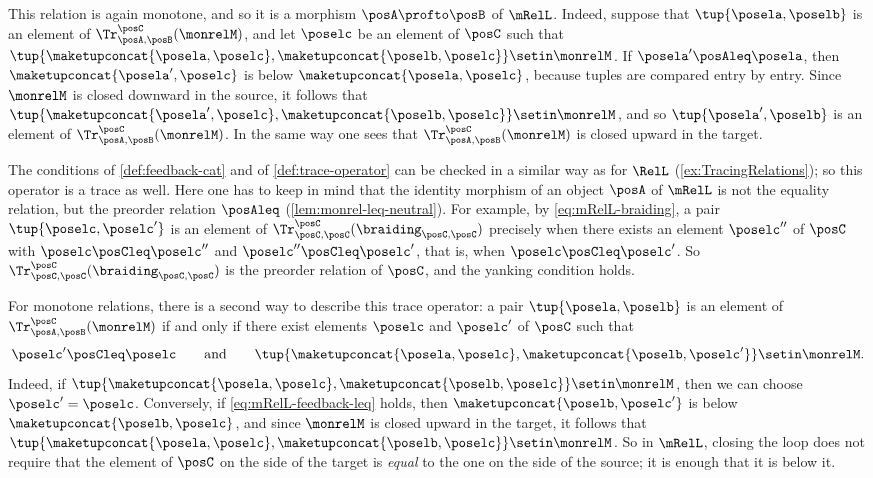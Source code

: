 This relation is again monotone, and so it is a morphism $\posA \profto \posB$ of $\mRelL$.
Indeed, suppose that $\tup{\posela, \poselb}$ is an element of $\Tr_{\posA,\posB}^{\posC}(\monrelM)$, and let $\poselc$ be an element of $\posC$ such that $\tup{\maketupconcat{\posela, \poselc}, \maketupconcat{\poselb, \poselc}} \setin \monrelM$.
If $\posela' \posAleq \posela$, then $\maketupconcat{\posela', \poselc}$ is below $\maketupconcat{\posela, \poselc}$, because tuples are compared entry by entry.
Since $\monrelM$ is closed downward in the source, it follows that $\tup{\maketupconcat{\posela', \poselc}, \maketupconcat{\poselb, \poselc}} \setin \monrelM$, and so $\tup{\posela', \poselb}$ is an element of $\Tr_{\posA,\posB}^{\posC}(\monrelM)$.
In the same way one sees that $\Tr_{\posA,\posB}^{\posC}(\monrelM)$ is closed upward in the target.

The conditions of \cref{def:feedback-cat} and of \cref{def:trace-operator} can be checked in a similar way as for $\RelL$ (\cref{ex:TracingRelations}); so this operator is a trace as well.
Here one has to keep in mind that the identity morphism of an object $\posA$ of $\mRelL$ is not the equality relation, but the preorder relation $\posAleq$ (\cref{lem:monrel-leq-neutral}).
For example, by \cref{eq:mRelL-braiding}, a pair $\tup{\poselc, \poselc'}$ is an element of $\Tr_{\posC,\posC}^{\posC}(\braiding_{\posC,\posC})$ precisely when there exists an element $\poselc''$ of $\posC$ with $\poselc \posCleq \poselc''$ and $\poselc'' \posCleq \poselc'$, that is, when $\poselc \posCleq \poselc'$.
So $\Tr_{\posC,\posC}^{\posC}(\braiding_{\posC,\posC})$ is the preorder relation of $\posC$, and the yanking condition holds.

For monotone relations, there is a second way to describe this trace operator: a pair $\tup{\posela, \poselb}$ is an element of $\Tr_{\posA,\posB}^{\posC}(\monrelM)$ if and only if there exist elements $\poselc$ and $\poselc'$ of $\posC$ such that
\begin{equation}
    \label{eq:mRelL-feedback-leq}
    \poselc' \posCleq \poselc
    \qquad \text{and} \qquad
    \tup{\maketupconcat{\posela, \poselc}, \maketupconcat{\poselb, \poselc'}} \setin \monrelM.
\end{equation}
Indeed, if $\tup{\maketupconcat{\posela, \poselc}, \maketupconcat{\poselb, \poselc}} \setin \monrelM$, then we can choose $\poselc' = \poselc$.
Conversely, if \cref{eq:mRelL-feedback-leq} holds, then $\maketupconcat{\poselb, \poselc'}$ is below $\maketupconcat{\poselb, \poselc}$, and since $\monrelM$ is closed upward in the target, it follows that $\tup{\maketupconcat{\posela, \poselc}, \maketupconcat{\poselb, \poselc}} \setin \monrelM$.
So in $\mRelL$, closing the loop does not require that the element of $\posC$ on the side of the target is \emph{equal} to the one on the side of the source; it is enough that it is below it.

